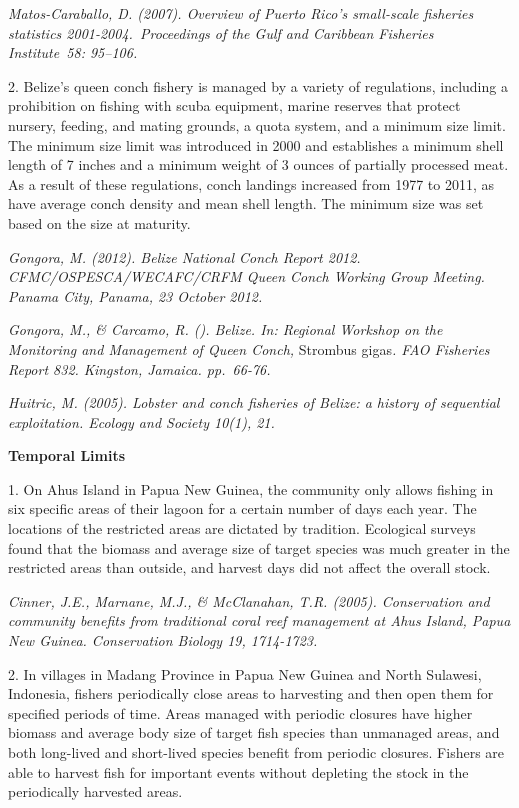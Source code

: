 \documentclass[]{book}
\begin{document}
\emph{Matos-Caraballo, D. (2007). Overview of Puerto Rico's small-scale
fisheries statistics 2001-2004.~Proceedings of the Gulf and Caribbean
Fisheries Institute~58: 95--106.}

2. Belize's queen conch fishery is managed by a variety of regulations,
including a prohibition on fishing with scuba equipment, marine reserves
that protect nursery, feeding, and mating grounds, a quota system, and a
minimum size limit. The minimum size limit was introduced in 2000 and
establishes a minimum shell length of 7 inches and a minimum weight of 3
ounces of partially processed meat. As a result of these regulations,
conch landings increased from 1977 to 2011, as have average conch
density and mean shell length. The minimum size was set based on the
size at maturity.

\emph{Gongora, M. (2012). Belize National Conch Report 2012.
CFMC/OSPESCA/WECAFC/CRFM Queen Conch Working Group Meeting. Panama City,
Panama, 23 October 2012.}

\emph{Gongora, M., \& Carcamo, R. (). Belize. In: Regional Workshop on
the Monitoring and Management of Queen Conch,} Strombus gigas\emph{. FAO
Fisheries Report 832. Kingston, Jamaica. pp.~66-76.}

\emph{Huitric, M. (2005). Lobster and conch fisheries of Belize: a
history of sequential exploitation. Ecology and Society 10(1), 21.}

\textbf{Temporal Limits}

1. On Ahus Island in Papua New Guinea, the community only allows fishing
in six specific areas of their lagoon for a certain number of days each
year. The locations of the restricted areas are dictated by tradition.
Ecological surveys found that the biomass and average size of target
species was much greater in the restricted areas than outside, and
harvest days did not affect the overall stock.

\emph{Cinner, J.E., Marnane, M.J., \& McClanahan, T.R. (2005).
Conservation and community benefits from traditional coral reef
management at Ahus Island, Papua New Guinea. Conservation Biology 19,
1714-1723.}

2. In villages in Madang Province in Papua New Guinea and North
Sulawesi, Indonesia, fishers periodically close areas to harvesting and
then open them for specified periods of time. Areas managed with
periodic closures have higher biomass and average body size of target
fish species than unmanaged areas, and both long-lived and short-lived
species benefit from periodic closures. Fishers are able to harvest fish
for important events without depleting the stock in the periodically
harvested areas.
\end{document}
